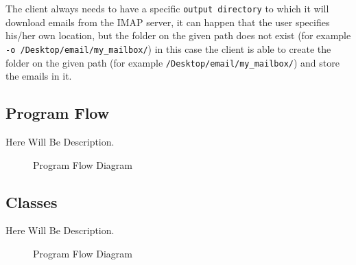 \documentclass[a4paper,11pt]{article}
\begin{document}
\smallskip

The client always needs to have a specific \verb!output directory! to which it will download emails 
from the IMAP server, it can happen that the user specifies his/her own location, but the 
folder on the given path does not exist (for example \verb!-o /Desktop/email/my_mailbox/!) in 
this case the client is able to create the folder on the given path 
(for example \verb!/Desktop/email/my_mailbox/!) and store the emails in it.


\newpage

\subsection{Program Flow}
Here Will Be Description.

\begin{figure}[H]
    \centering
    \caption{Program Flow Diagram}
    \label{figure:program-flow-diagram}
\end{figure}

\newpage
\subsection{Classes}
Here Will Be Description.

\begin{figure}[H]
    \centering
    \caption{Program Flow Diagram}
    \label{figure:client-config}
\end{figure}
\end{document}
